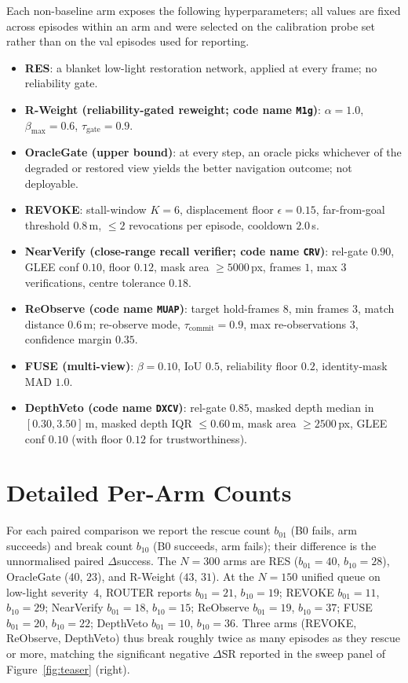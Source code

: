 Each non-baseline arm exposes the following hyperparameters; all values are
fixed across episodes within an arm and were selected on the calibration
probe set rather than on the val episodes used for reporting.
\begin{itemize}
\item \textbf{RES}: a blanket low-light restoration network, applied at
every frame; no reliability gate.
\item \textbf{R-Weight (reliability-gated reweight; code name
\texttt{M1g})}: $\alpha{=}1.0$, $\beta_{\max}{=}0.6$,
$\tau_{\text{gate}}{=}0.9$.
\item \textbf{OracleGate (upper bound)}: at every step, an oracle picks
whichever of the degraded or restored view yields the better navigation
outcome; not deployable.
\item \textbf{REVOKE}: stall-window $K{=}6$, displacement floor
$\epsilon{=}0.15$, far-from-goal threshold $0.8$\,m, $\leq 2$ revocations
per episode, cooldown $2.0$\,s.
\item \textbf{NearVerify (close-range recall verifier; code name
\texttt{CRV})}: rel-gate $0.90$, GLEE
conf $0.10$, floor $0.12$, mask area $\geq 5000$\,px, frames $1$, max $3$
verifications, centre tolerance $0.18$.
\item \textbf{ReObserve (code name \texttt{MUAP})}: target hold-frames $8$,
min frames $3$, match distance $0.6$\,m; re-observe mode,
$\tau_{\text{commit}}{=}0.9$, max re-observations $3$, confidence margin
$0.35$.
\item \textbf{FUSE (multi-view)}: $\beta{=}0.10$, IoU $0.5$, reliability
floor $0.2$, identity-mask MAD $1.0$.
\item \textbf{DepthVeto (code name \texttt{DXCV})}: rel-gate $0.85$, masked depth median in
$[0.30, 3.50]$\,m, masked depth IQR $\leq 0.60$\,m, mask area
$\geq 2500$\,px, GLEE conf $0.10$ (with floor $0.12$ for trustworthiness).
\end{itemize}

\section{Detailed Per-Arm Counts}
\label{app:per-arm-counts}

For each paired comparison we report the rescue count $b_{01}$ (B0 fails,
arm succeeds) and break count $b_{10}$ (B0 succeeds, arm fails); their
difference is the unnormalised paired $\Delta$success. The $N{=}300$ arms
are RES ($b_{01}{=}40$, $b_{10}{=}28$), OracleGate ($40$, $23$), and R-Weight
($43$, $31$). At the $N{=}150$ unified queue on low-light severity~$4$, ROUTER
reports $b_{01}{=}21$, $b_{10}{=}19$;
REVOKE $b_{01}{=}11$, $b_{10}{=}29$;
NearVerify $b_{01}{=}18$, $b_{10}{=}15$;
ReObserve  $b_{01}{=}19$, $b_{10}{=}37$;
FUSE   $b_{01}{=}20$, $b_{10}{=}22$;
DepthVeto  $b_{01}{=}10$, $b_{10}{=}36$.
Three arms (REVOKE, ReObserve, DepthVeto) thus break roughly twice as many
episodes as they rescue or more, matching the significant negative
$\Delta$SR reported in the sweep panel of Figure~\ref{fig:teaser} (right).


